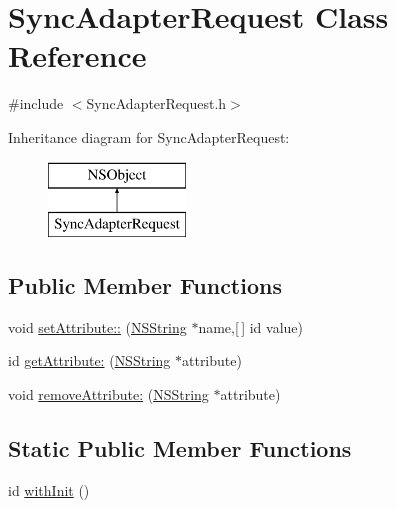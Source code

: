\hypertarget{interface_sync_adapter_request}{
\section{\-Sync\-Adapter\-Request \-Class \-Reference}
\label{interface_sync_adapter_request}
}


{\ttfamily \#include $<$\-Sync\-Adapter\-Request.\-h$>$}

\-Inheritance diagram for \-Sync\-Adapter\-Request\-:\begin{figure}[H]
\begin{center}
\leavevmode
\includegraphics[height=2.000000cm]{interface_sync_adapter_request}
\end{center}
\end{figure}
\subsection*{\-Public \-Member \-Functions}
\begin{DoxyCompactItemize}
\item 
void \hyperlink{interface_sync_adapter_request_aa1abcd1d84cce70fe42285ddee4ec8f3}{set\-Attribute\-::} (\hyperlink{class_n_s_string}{\-N\-S\-String} $\ast$name,\mbox{[}$\,$\mbox{]} id value)
\item 
id \hyperlink{interface_sync_adapter_request_a7dc21feb37a4e18d2794911bf81c257c}{get\-Attribute\-:} (\hyperlink{class_n_s_string}{\-N\-S\-String} $\ast$attribute)
\item 
void \hyperlink{interface_sync_adapter_request_a60b3bdee9971c8827e620f28c0c9bc14}{remove\-Attribute\-:} (\hyperlink{class_n_s_string}{\-N\-S\-String} $\ast$attribute)
\end{DoxyCompactItemize}
\subsection*{\-Static \-Public \-Member \-Functions}
\begin{DoxyCompactItemize}
\item 
id \hyperlink{interface_sync_adapter_request_afd2c27aa1f198dce37a0389584f67c65}{with\-Init} ()
\end{DoxyCompactItemize}


